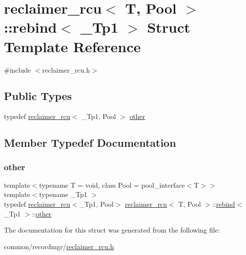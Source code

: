 \hypertarget{structreclaimer__rcu_1_1rebind}{}\section{reclaimer\+\_\+rcu$<$ T, Pool $>$\+:\+:rebind$<$ \+\_\+\+Tp1 $>$ Struct Template Reference}
\label{structreclaimer__rcu_1_1rebind}


{\ttfamily \#include $<$reclaimer\+\_\+rcu.\+h$>$}

\subsection*{Public Types}
\begin{DoxyCompactItemize}
\item 
typedef \hyperlink{classreclaimer__rcu}{reclaimer\+\_\+rcu}$<$ \+\_\+\+Tp1, Pool $>$ \hyperlink{structreclaimer__rcu_1_1rebind_a472b40e8d3889c1880cfbab7df2e90e8}{other}
\end{DoxyCompactItemize}


\subsection{Member Typedef Documentation}
\mbox{\label{structreclaimer__rcu_1_1rebind_a472b40e8d3889c1880cfbab7df2e90e8}} 
\subsubsection{\texorpdfstring{other}{other}}
{\footnotesize\ttfamily template$<$typename T  = void, class Pool  = pool\+\_\+interface$<$\+T$>$$>$ \\
template$<$typename \+\_\+\+Tp1 $>$ \\
typedef \hyperlink{classreclaimer__rcu}{reclaimer\+\_\+rcu}$<$\+\_\+\+Tp1, Pool$>$ \hyperlink{classreclaimer__rcu}{reclaimer\+\_\+rcu}$<$ T, Pool $>$\+::\hyperlink{structreclaimer__rcu_1_1rebind}{rebind}$<$ \+\_\+\+Tp1 $>$\+::\hyperlink{structreclaimer__rcu_1_1rebind_a472b40e8d3889c1880cfbab7df2e90e8}{other}}



The documentation for this struct was generated from the following file\+:\begin{DoxyCompactItemize}
\item 
common/recordmgr/\hyperlink{reclaimer__rcu_8h}{reclaimer\+\_\+rcu.\+h}\end{DoxyCompactItemize}

